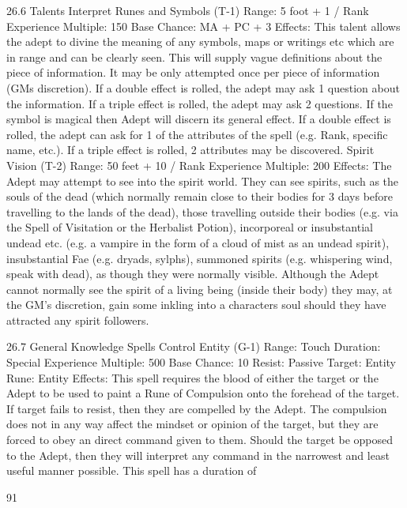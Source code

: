 \documentclass[a4paper]{article}
\begin{document}
\begin{multicols}{3}
26.6 Talents
Interpret Runes and Symbols (T-1)
Range: 5 foot + 1 / Rank
Experience Multiple: 150
Base Chance: MA + PC + 3%
Effects: This talent allows the adept to divine the
meaning of any symbols, maps or writings etc
which are in range and can be clearly seen. This
will supply vague definitions about the piece of
information. It may be only attempted once per
piece of information (GMs discretion). If a double
effect is rolled, the adept may ask 1 question about
the information. If a triple effect is rolled, the adept
may ask 2 questions.
If the symbol is magical then Adept will discern its
general effect. If a double effect is rolled, the adept
can ask for 1 of the attributes of the spell (e.g.
Rank, specific name, etc.). If a triple effect is
rolled, 2 attributes may be discovered.
Spirit Vision (T-2)
Range: 50 feet + 10 / Rank
Experience Multiple: 200
Effects: The Adept may attempt to see into the
spirit world. They can see spirits, such as the souls
of the dead (which normally remain close to their
bodies for 3 days before travelling to the lands of
the dead), those travelling outside their bodies (e.g.
via the Spell of Visitation or the Herbalist Potion),
incorporeal or insubstantial undead etc. (e.g. a
vampire in the form of a cloud of mist as an undead spirit), insubstantial Fae (e.g. dryads, sylphs),
summoned spirits (e.g. whispering wind, speak
with dead), as though they were normally visible.
Although the Adept cannot normally see the spirit
of a living being (inside their body) they may, at
the GM’s discretion, gain some inkling into a characters soul should they have attracted any spirit
followers.

26.7 General Knowledge Spells
Control Entity (G-1)
Range: Touch
Duration: Special
Experience Multiple: 500
Base Chance: 10%
Resist: Passive
Target: Entity
Rune: Entity
Effects: This spell requires the blood of either the
target or the Adept to be used to paint a Rune of
Compulsion onto the forehead of the target. If
target fails to resist, then they are compelled by the
Adept.
The compulsion does not in any way affect the
mindset or opinion of the target, but they are forced
to obey an direct command given to them. Should
the target be opposed to the Adept, then they will
interpret any command in the narrowest and least
useful manner possible. This spell has a duration of

91


\end{multicols}
\end{document}
